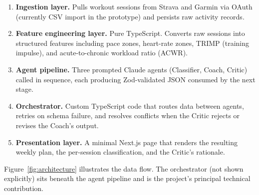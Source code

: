 \begin{enumerate}
  \item \textbf{Ingestion layer.} Pulls workout sessions from Strava and Garmin via OAuth (currently CSV import in the prototype) and persists raw activity records.
  \item \textbf{Feature engineering layer.} Pure TypeScript. Converts raw sessions into structured features including pace zones, heart-rate zones, TRIMP (training impulse), and acute-to-chronic workload ratio (ACWR).
  \item \textbf{Agent pipeline.} Three prompted Claude agents (Classifier, Coach, Critic) called in sequence, each producing Zod-validated JSON consumed by the next stage.
  \item \textbf{Orchestrator.} Custom TypeScript code that routes data between agents, retries on schema failure, and resolves conflicts when the Critic rejects or revises the Coach's output.
  \item \textbf{Presentation layer.} A minimal Next.js page that renders the resulting weekly plan, the per-session classification, and the Critic's rationale.
\end{enumerate}

Figure~\ref{fig:architecture} illustrates the data flow. The orchestrator (not shown explicitly) sits beneath the agent pipeline and is the project's principal technical contribution.

